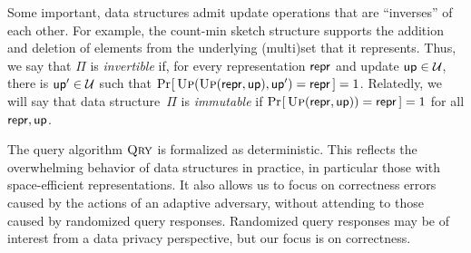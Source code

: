 Some important, data structures admit update operations that are ``inverses'' of each other.  For example, the count-min sketch structure supports the addition and deletion of elements from the underlying (multi)set that it represents.  Thus, we say that $\Pi$ is {\em invertible} if, for every representation $\mathsf{repr}$ and update $\mathsf{up} \in \mathcal{U}$, there is $\mathsf{up}' \in \mathcal{U}$ such that $\Pr\hspace{-1pt}\left[\,\textsc{Up}(\textsc{Up}(\mathsf{repr},\mathsf{up}),\mathsf{up}') = \mathsf{repr}\,\right] = 1$.  Relatedly, we will say that data structure~$\Pi$ is \emph{immutable} if $\Pr\hspace{-1pt}\left[\,\textsc{Up}(\mathsf{repr},\mathsf{up}))=\mathsf{repr}\,\right]=1$ for all $\mathsf{repr},\mathsf{up}$.

The query algorithm $\textsc{Qry}$ is formalized as deterministic.  This reflects the overwhelming behavior of data structures in practice, in particular those with space-efficient representations.  It also allows us to focus on correctness errors caused by the actions of an adaptive adversary, without attending to those caused by randomized query responses.  Randomized query responses may be of interest from a data privacy perspective, but our focus is on correctness.


